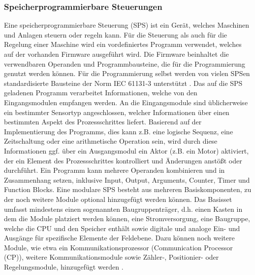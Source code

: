 \subsubsection{Speicherprogrammierbare Steuerungen}
Eine speicherprogrammierbare Steuerung (SPS) ist ein Gerät, welches Maschinen und Anlagen steuern oder regeln kann. Für die Steuerung als auch für die Regelung einer Maschine wird ein vordefiniertes Programm verwendet, welches auf der vorhanden Firmware ausgeführt wird. Die Firmware beinhaltet die verwendbaren Operanden und Programmbausteine, die für die Programmierung genutzt werden können. Für die Programmierung selbst werden von vielen SPSen standardisierte Bausteine der Norm IEC 61131-3 unterstützt \citep{Hoenle2017}.
Das auf die SPS geladenen Programm verarbeitet Informationen, welche von den Eingangsmodulen empfangen werden. An die Eingangsmodule sind üblicherweise ein bestimmter Sensortyp angeschlossen, welcher Informationen über einen bestimmten Aspekt des Prozessschrittes liefert. Basierend auf der Implementierung des Programms, dies kann z.B. eine logische Sequenz, eine Zeitschaltung oder eine arithmetische Operation sein, wird durch diese Informationen ggf. über ein Ausgangsmodul ein Aktor (z.B. ein Motor) aktiviert, der ein Element des Prozessschrittes kontrolliert und Änderungen anstößt oder durchführt. Ein Programm kann mehrere Operanden kombinieren und in Zusammenhang setzen, inklusive Input, Output, Arguments, Counter, Timer und Function Blocks.
Eine modulare SPS besteht aus mehreren Basiskomponenten, zu der noch weitere Module optional hinzugefügt werden können. Das Basisset umfasst mindestens einen sogenannten Baugruppenträger, d.h. einen Kasten in dem die Module platziert werden können, eine Stromversorgung, eine Baugruppe, welche die CPU und den Speicher enthält sowie digitale und analoge Ein- und Ausgänge für spezifische Elemente der Feldebene. 
Dazu können noch weitere Module, wie etwa ein Kommunikationsprozessor (Communication Processor (CP)), weitere Kommunikationsmodule sowie Zähler-, Positionier- oder Regelungsmodule, hinzugefügt werden \citep{Hoenle2017}. 

